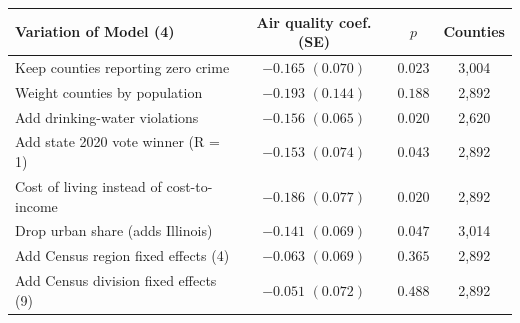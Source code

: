 \begin{tabular}{@{}lccc@{}}
\toprule
Variation of Model (4) & Air quality coef. (SE) & $p$ & Counties \\
\midrule
Keep counties reporting zero crime & $-0.165$ $(0.070)$ & $0.023$ & 3,004 \\
Weight counties by population & $-0.193$ $(0.144)$ & $0.188$ & 2,892 \\
Add drinking-water violations & $-0.156$ $(0.065)$ & $0.020$ & 2,620 \\
Add state 2020 vote winner (R = 1) & $-0.153$ $(0.074)$ & $0.043$ & 2,892 \\
Cost of living instead of cost-to-income & $-0.186$ $(0.077)$ & $0.020$ & 2,892 \\
Drop urban share (adds Illinois) & $-0.141$ $(0.069)$ & $0.047$ & 3,014 \\
Add Census region fixed effects (4) & $-0.063$ $(0.069)$ & $0.365$ & 2,892 \\
Add Census division fixed effects (9) & $-0.051$ $(0.072)$ & $0.488$ & 2,892 \\
\bottomrule
\end{tabular}
